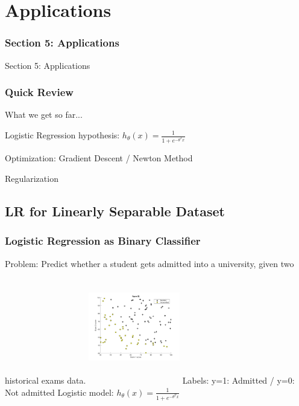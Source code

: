 
\section{Applications}
\begin{frame}
\huge\frametitle{Section 5: Applications}
\centering
Section 5: Applications
\par
\end{frame}
\begin{frame}
\frametitle{Quick Review}

What we get so far... \newline\newline

Logistic Regression hypothesis: $h_\theta(x)=\frac{1}{1+e^{-\theta^Tx}}$\newline\newline

Optimization: Gradient Descent / Newton Method\newline\newline

Regularization\newline\newline

\end{frame}

\subsection{LR for Linearly Separable Dataset}
\begin{frame}
\frametitle{Logistic Regression as Binary Classifier}
Problem: Predict whether a student gets admitted into a university, given two historical exams data.\newline\newline
\includegraphics[width=4cm,height=5cm,keepaspectratio]{pictures/1_plotData1}\newline
Labels: y=1: Admitted / y=0: Not admitted\newline\newline
Logistic model: $h_\theta(x)=\frac{1}{1+e^{-\theta^Tx}}$\newline\newline
\end{frame}

